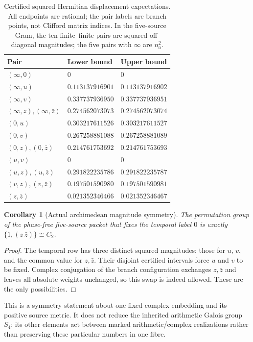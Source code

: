 \documentclass[11pt]{article}
\newtheorem{corollary}[corollary]{Corollary}
\theoremstyle{definition}
\theoremstyle{remark}
\begin{document}
\begin{table}[htbp]
\centering\small
\caption{Certified squared Hermitian displacement expectations. All
endpoints are rational; the pair labels are branch points, not Clifford
matrix indices. In the five-source Gram, the ten finite--finite pairs are
squared off-diagonal magnitudes; the five pairs with $\infty$ are $n_a^2$.}
\label{tab:v3-moments}
\begin{tabular}{lll}
\toprule
Pair & Lower bound & Upper bound\\\midrule
$(\infty,0)$ & $0$ & $0$\\
$(\infty,u)$ & $0.113137916901$ & $0.113137916902$\\
$(\infty,v)$ & $0.337737936950$ & $0.337737936951$\\
$(\infty,z),(\infty,\bar z)$ & $0.274562073073$ & $0.274562073074$\\
$(0,u)$ & $0.303217611526$ & $0.303217611527$\\
$(0,v)$ & $0.267258881088$ & $0.267258881089$\\
$(0,z),(0,\bar z)$ & $0.214761753692$ & $0.214761753693$\\
$(u,v)$ & $0$ & $0$\\
$(u,z),(u,\bar z)$ & $0.291822235786$ & $0.291822235787$\\
$(v,z),(v,\bar z)$ & $0.197501590980$ & $0.197501590981$\\
$(z,\bar z)$ & $0.021352346466$ & $0.021352346467$\\
\bottomrule
\end{tabular}
\end{table}

\begin{corollary}[Actual archimedean magnitude symmetry]
\label{cor:v3-symmetry}
The permutation group of the phase-free five-source packet that fixes the
temporal label $0$ is exactly
$\{1,(z\ \bar z)\}\cong C_2$.
\end{corollary}
\begin{proof}
The temporal row has three distinct squared magnitudes: those for $u$, $v$,
and the common value for $z,\bar z$. Their disjoint certified intervals
force $u$ and $v$ to be fixed. Complex conjugation of the branch configuration
exchanges $z,\bar z$ and leaves all absolute weights unchanged, so this
swap is indeed allowed. These are the only possibilities.
\end{proof}

This is a symmetry statement about one fixed complex embedding and its
positive source metric. It does not reduce the inherited arithmetic Galois
group $S_4$; its other elements act between marked arithmetic/complex
realizations rather than preserving these particular numbers in one fibre.
\end{document}
